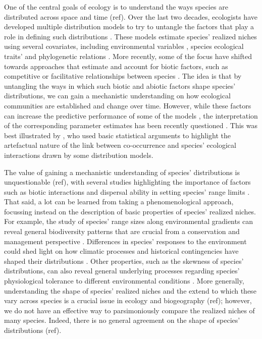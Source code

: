 \documentclass[11pt, a4paper]{article}
\begin{document}
One of the central goals of ecology is to understand the ways species are distributed across space and time (ref). Over the last two decades, ecologists have developed multiple distribution models to try to untangle the factors that play a role in defining such distributions \citep{guisanPredictiveHabitatDistribution2000}. These models estimate species' realized niches using several covariates, including environmental variables \citep{Guisan}, species ecological traits' \citep{pollockRoleFunctionalTraits2012} and phylogenetic relations \citep{ivesGeneralizedLinearMixed2011}. More recently, some of the focus have shifted towards approaches that estimate and account for biotic factors, such as competitive or facilitative relationships between species \citep{ovaskainenHowMakeMore2017}. The idea is that by untangling the ways in which such biotic and abiotic factors shape species' distributions, we can gain a mechanistic understanding on how ecological communities are established and change over time. However, while these factors can increase the predictive performance of some of the models \citep{norbergComprehensiveEvaluationPredictive2019}, the interpretation of the corresponding parameter estimates has been recently questioned \citep{harrisInferringSpeciesInteractions2016, thurmanTestingLinkSpecies2019, poggiatoInterpretationsJointModeling2021}. This was best illustrated by \citet{blanchetCooccurrenceNotEvidence2020}, who used basic statistical arguments to highlight the artefactual nature of the link between co-occurrence and species' ecological interactions drawn by some distribution models.

The value of gaining a mechanistic understanding of species' distributions is unquestionable (ref), with several studies highlighting the importance of factors such as biotic interactions and dispersal ability in setting species' range limits \citep{wiszRoleBioticInteractions2013, pollockUnderstandingCooccurrenceModelling2014, neuschulzBioticInteractionsSeed2018}. That said, a lot can be learned from taking a phenomenological approach, focussing instead on the description of basic properties of species' realized niches. For example, the study of species' range sizes along environmental gradients can reveal general biodiversity patterns that are crucial from a conservation and management perspective \citep{stevensElevationalGradientAltitudinal1992}. Differences in species' responses to the environment could shed light on how climatic processes and historical contingencies have shaped their distributions \citep{rohdeLatitudinalGradientsSpecies1992, more in Rapoport}. Other properties, such as the skewness of species' distributions, can also reveal general underlying processes regarding species' physiological tolerance to different environmental conditions \citep{kaufmanDiversityNewWorld1995}. More generally, understanding the shape of species' realized niches and the extend to which these vary across species is a crucial issue in ecology and biogeography (ref); however, we do not have an effective way to parsimoniously compare the realized niches of many species. Indeed, there is no general agreement on the shape of species' distributions (ref).
\end{document}
